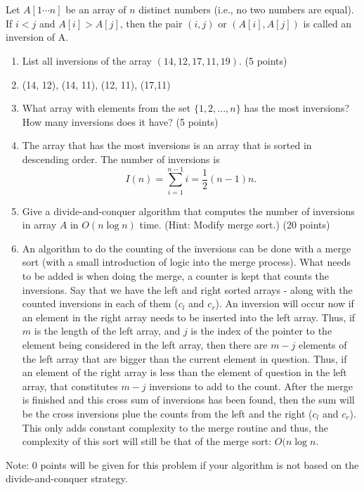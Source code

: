 \documentclass{article}
\begin{document}
\section{}
 Let $A[1\cdots n]$ be an array of $n$ distinct numbers (i.e., no two
 numbers are equal). If $i < j$ and $A[i] > A[j]$, then the pair
 $(i,j)$ or $(A[i],A[j])$ is called an inversion of A. 
 \begin{enumerate}[label=(\alph*)]
 \item List all inversions of the array $(14,12,17,11,19)$. (5 points)
 \item[] (14, 12), (14, 11), (12, 11), (17,11)
 \item What array with elements from the set $\{1,2,...,n\}$ has the
   most inversions? How many inversions does it have? (5 points) 
 \item[]
   The array that has the most inversions is an array that is sorted
   in descending order.  The number of inversions is 
   \begin{equation}
     I(n) = \sum_{i=1}^{n-1}i = \frac{1}{2}(n-1)n.
   \end{equation}
 \item Give a divide-and-conquer algorithm that computes the number of 
   inversions in array $A$ in $O(n\log n)$ time. (Hint: Modify merge
   sort.) (20 points)
 \item[] 
   An algorithm to do the counting of the inversions can be done with
   a merge sort (with a small introduction of logic into the merge
   process).
   What needs to be added is when doing the merge, a counter is kept
   that counts the inversions.  Say that we have the left and right
   sorted arrays - along with the counted inversions in each of them
   ($c_l$ and $c_r$). An inversion will occur now if an element in the
   right array needs to be inserted into the left array.  Thus, if $m$
   is the length of the left array, and $j$ is the index of the
   pointer to the element being considered in the left array, then
   there are $m-j$ elements of the left array that are bigger than the
   current element in question.  Thus, if an element of the right
   array is less than the element of question in the left array, that
   constitutes $m-j$ inversions to add to the count.  After the merge
   is finished and this cross sum of inversions has been found, then
   the sum will be the cross inversions plue the counts from the left
   and the right ($c_l$ and $c_r$).
   This only adds constant complexity to the merge routine and thus,
   the complexity of this sort will still be that of the merge sort:
   $O(n\log n$.





 \end{enumerate}
Note: 0 points will be given for this problem if your algorithm is not
based on the divide-and-conquer strategy.
\end{document}

